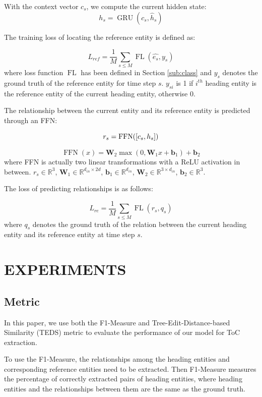 \documentclass[a4paper,conference]{IEEEtran}
\begin{document}
With the context vector $c_s$, we compute the current hidden state:
$$h_s = \operatorname{GRU}(c_s, \hat{h}_s)$$

The training loss of locating the reference entity is defined as:

$$L_{ref} = \frac{1}{M}\sum_{s \le M}\operatorname{FL}(\hat{e_s}, y_s)$$
where loss function $\operatorname{FL}$ has been defined in Section \ref{sub:class} and $y_s$ denotes the ground truth of the reference entity for time step $s$. $y_{si}$ is 1 if $i^{th}$ heading entity is the reference entity of the current heading entity, otherwise 0.

The relationship between the current entity and its reference entity is predicted through an FFN\cite{transformer}:

$$r_s = {{\rm FFN}}([c_s, h_s])$$

$$\operatorname{FFN}({x})=\mathbf{W}_{2}\max \left(0,  \mathbf{W}_1{x}+\mathbf{b}_{1}\right) + \mathbf{b}_{2}$$
where FFN is actually two linear transformations with a ReLU activation
in between. $r_s \in \mathbb{R}^{3}$, $\mathbf{W}_{1} \in \mathbb{R}^{d_{in} \times 2d}$, $\mathbf{b}_{1} \in \mathbb{R}^{d_{in}}$, $\mathbf{W}_{2} \in \mathbb{R}^{3 \times d_{in}}$, $\mathbf{b}_{2} \in \mathbb{R}^{3}$.

The loss of predicting relationships is as follows:

$$L_{re} = \frac{1}{M}\sum_{s \le M}\operatorname{FL}({r_s}, q_s)$$
where $q_s$ denotes the ground truth of the relation between the current heading entity and its reference entity at time step $s$.






\section{EXPERIMENTS}

\subsection{Metric}
In this paper, we use both the F1-Measure and Tree-Edit-Distance-based Similarity (TEDS) metric\cite{teds} to evaluate the performance of our model for ToC extraction. 

To use the F1-Measure, the relationships among the heading entities and corresponding reference entities need to be extracted. Then F1-Measure measures the percentage of correctly extracted pairs of heading entities, where heading entities and the relationships between them are the same as the ground truth.
\end{document}
